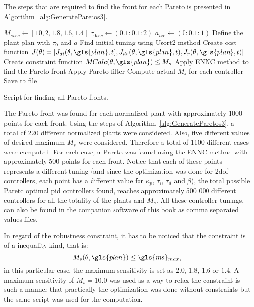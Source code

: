 The steps that are required to find the front for each Pareto is presented in Algorithm~\ref{alg:GenerateParetos3}.
%
\begin{algorithm}[tb]
	\begin{algorithmic}
		\State $M_{svec} \gets [10,2,1.8,1.6,1.4]$
		\State $\tau_{0vec} \gets (0.1:0.1:2)$
		\State $a_{vec} \gets (0:0.1:1)$
			\State Define the plant \gls{plan} with $\tau_{0}$ and $a$
			\State Find initial tuning  using Usort2 method
			\State Create cost function $J(\theta) = [J_{di}(\theta, \gls{plan}, t),J_{do}(\theta, \gls{plan}, t),J_{r}(\theta, \gls{plan}, t) ]$
			\State Create constraint function $MCalc(\theta, \gls{plan}) \leq M_s$
			\State Apply ENNC method to find the Pareto front
			\State Apply Pareto filter
			\State Compute actual $M_s$ for each controller
			\State Save to file
		\EndFor
	\end{algorithmic}
\caption{Script for finding all Pareto fronts.}
\label{alg:GenerateParetos3}
\end{algorithm}
%

The Pareto front was found for each normalized plant with approximately 1000 points for each front. Using the steps of Algorithm~\ref{alg:GenerateParetos3}, a total of 220 different normalized plants were considered. Also, five different values of desired maximum $M_s$ were considered. Therefore a total of 1100 different cases were computed. For each case, a Pareto was found using the ENNC method with approximately 500 points for each front. Notice that each of these points represents a different tuning (and since the optimization was done for \gls{2dof} controllers, each point has a different value for $\kappa_p$, $\tau_i$, $\tau_d$ and $\beta$), the total possible Pareto optimal \gls{pid} controllers found, reaches approximately 500 000 different controllers for all the totality of the plants and $M_s$. All these controller tunings, can also be found in the companion software of this book as comma separated values files.

In regard of the robustness constraint, it has to be noticed that the constraint is of a inequality kind, that is:
\begin{equation*}
	M_s(\theta, \gls{plan}) \leq \gls{ms}\mbox{}_{max},
\end{equation*} 
in this particular case, the maximum sensitivity is set as $2.0$, $1.8$, $1.6$ or $1.4$. A maximum sensitivity of $M_s = 10.0$ was used as a way to relax the constraint is such a manner that practically the optimization was done without constraints but the same script was used for the computation.

